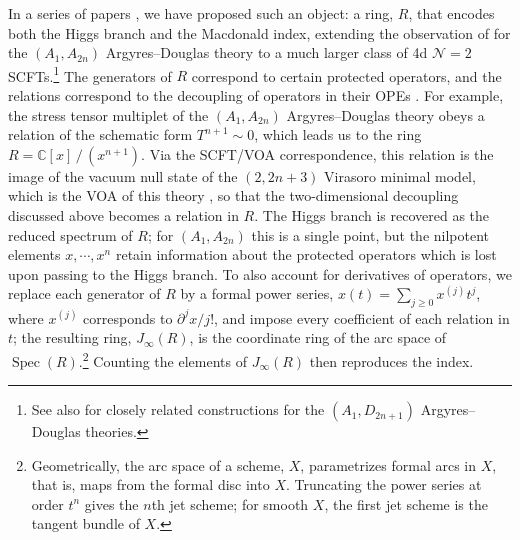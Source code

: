 \documentclass[12pt]{article}
\numberwithin{equation}{section}
\numberwithin{figure}{section}
\theoremstyle{plain}
\theoremstyle{definition}
\begin{document}
In a series of papers \cite{Kang:2025zub,Kang:2026nge,Kang:2026ona,Kang:2026ney,Kang:2026jnv}, we have proposed such an object: a ring, $R$, that encodes both the Higgs branch and the Macdonald index, extending the observation of \cite{Bhargava:2023hsc} for the $(A_1, A_{2n})$ Argyres--Douglas theory to a much larger class of 4d $\mathcal{N}=2$ SCFTs.\footnote{See also \cite{Andrews:2025krn} for closely related constructions for the $(A_1, D_{2n+1})$ Argyres--Douglas theories.} The generators of $R$ correspond to certain protected operators, and the relations correspond to the decoupling of operators in their OPEs \cite{Liendo:2015ofa,Agarwal:2018zqi, Song:2021dhu}. For example, the stress tensor multiplet of the $(A_1, A_{2n})$ Argyres--Douglas theory obeys a relation of the schematic form $T^{n+1} \sim 0$, which leads us to the ring $R = \mathbb{C}[x] \, / \, (x^{n+1})$. Via the SCFT/VOA correspondence, this relation is the image of the vacuum null state of the $(2, 2n+3)$ Virasoro minimal model, which is the VOA of this theory \cite{Beem:2013sza,Cordova:2015nma}, so that the two-dimensional decoupling discussed above becomes a relation in $R$. The Higgs branch is recovered as the reduced spectrum of $R$; for $(A_1, A_{2n})$ this is a single point, but the nilpotent elements $x, \cdots, x^n$ retain information about the protected operators which is lost upon passing to the Higgs branch. To also account for derivatives of operators, we replace each generator of $R$ by a formal power series, $x(t) = \sum_{j \geq 0} x^{(j)} t^j$, where $x^{(j)}$ corresponds to $\partial^j x / j!$, and impose every coefficient of each relation in $t$; the resulting ring, $J_\infty(R)$, is the coordinate ring of the arc space of $\operatorname{Spec}(R)$.\footnote{Geometrically, the arc space of a scheme, $X$, parametrizes formal arcs in $X$, that is, maps from the formal disc into $X$. Truncating the power series at order $t^n$ gives the $n$th jet scheme; for smooth $X$, the first jet scheme is the tangent bundle of $X$.} Counting the elements of $J_\infty(R)$ then reproduces the index.
\end{document}
